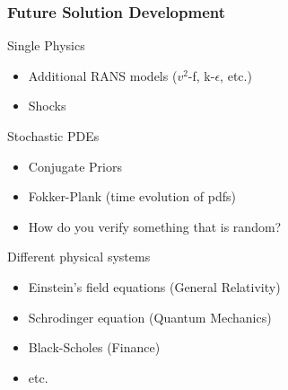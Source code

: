 \documentclass[mathserif]{beamer}
\begin{document}
\begin{frame}
  \frametitle{Future Solution Development}

  \begin{block}{Single Physics}
    \begin{itemize}
    \item Additional RANS models ($v^2$-f, k-$\epsilon$, etc.)
    \item Shocks
    \end{itemize}
  \end{block}

  \begin{block}{Stochastic PDEs}    
    \begin{itemize}
     \item Conjugate Priors
     \item Fokker-Plank (time evolution of pdfs)
     \item How do you verify something that is random?
    \end{itemize}
  \end{block}

  \begin{block}{Different physical systems}
    \begin{itemize}
    \item Einstein's field equations (General Relativity)
    \item Schrodinger equation (Quantum Mechanics)
    \item Black-Scholes (Finance)
    \item etc.
    \end{itemize}
  \end{block}

\end{frame}

\end{document}
